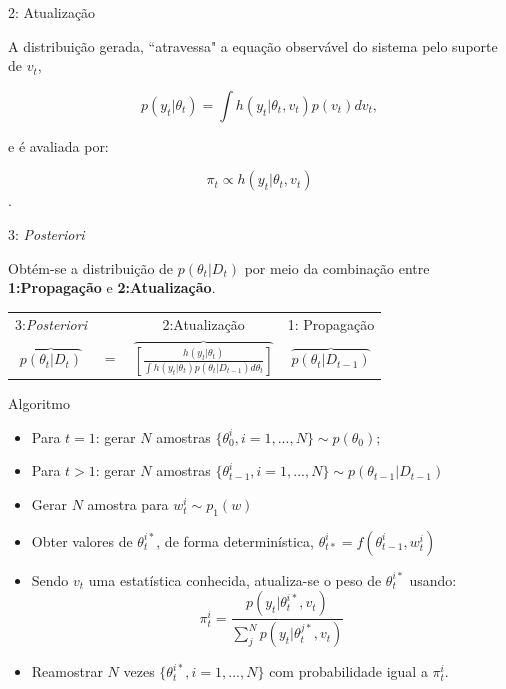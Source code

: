 \documentclass{beamer}
\begin{document}
\begin{frame}{2: Atualização}

A distribuição gerada, ``atravessa" a equação observável do sistema pelo suporte de $v_t$,

$$
p(y_t|\theta_{t}) = \int h(y_t|\theta_{t},v_{t})p(v_{t})dv_{t},
$$
\pause

e é avaliada por:

$$ \pi_t \propto h(y_t|\theta_t, v_{t})$$.


\end{frame}

\begin{frame}{3: \textit{Posteriori}}


Obtém-se a distribuição de $p(\theta_{t}|D_t)$ por meio da combinação entre \textbf{1:Propagação} e  \textbf{2:Atualização}.

\vspace{0.5cm}

\pause

\begin{tabular}{cccc}
3:\textit{Posteriori} & & 2:Atualização & 1: Propagação \\
$\overbrace{p(\theta_t|D_t)} $ & $=$ & $\overbrace{\left[\frac{h(y_t|\theta_t)}{\int h(y_t|\theta_t)p(\theta_t|D_{t-1})d \theta_t}\right]} $& $\overbrace{p(\theta_t|D_{t-1})}$
\end{tabular}


\end{frame}

\begin{frame}{Algoritmo}

\begin{itemize}
\item[1.1] Para $t=1$: gerar $N$ amostras $\{\theta_{0}^{i}, i= 1,...,N\} \sim p(\theta_0)$;
\item[1.2] Para $t>1$: gerar $N$ amostras $\{\theta_{t-1}^{i}, i= 1,...,N\}\sim p(\theta_{t-1}|D_{t-1})$
\end{itemize}
\begin{itemize}
\item[2] Gerar $N$ amostra para $w_{t}^{i} \sim p_1(w)$
\item[3] Obter valores de $\theta^{i*}_{t}$, de forma determinística, $\theta_{t*}^{i} = f(\theta_{t-1}^{i},w_{t}^{i})$
\item[4] Sendo $v_t$ uma estatística conhecida, atualiza-se o peso de $\theta^{i*}_{t}$ usando:
$$
\pi^{i}_t = \frac{p(y_t|\theta_t^{i*},v_t)}{\sum^N_j p(y_t|\theta_t^{j*},v_t)}
$$
\item[5] Reamostrar $N$ vezes $\{\theta_{t}^{i*}, i= 1,...,N\}$ com probabilidade igual a $\pi_{t}^{i}$.
\end{itemize}

\end{frame}
\end{document}
